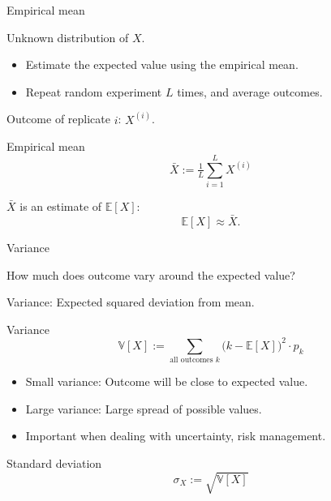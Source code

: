 \documentclass{beamer}
\newcommand{\E}{\mathbb{E}}
\newcommand{\V}{\mathbb{V}}
\newcommand{\1}{\ensuremath{\mathbf{1}}}
\begin{document}
\begin{frame}{Empirical mean}
    \begin{block}{}
        Unknown distribution of $X$.
        \begin{itemize}
            \item Estimate the expected value using the empirical mean.
        \end{itemize}
    \end{block}
    \begin{itemize}
        \item Repeat random experiment $L$ times, and average outcomes.
    \end{itemize}
    Outcome of replicate $i$: $X^{(i)}$.
    \begin{block}{Empirical mean}
        \begin{equation}
            \bar{X} := \tfrac{1}{L} \sum_{i=1}^L X^{(i)}
        \end{equation}
    \end{block}
    $\bar{X}$ is an estimate of $\E[X]$:
    \begin{equation}
        \E[X] \approx \bar{X}.
    \end{equation}
\end{frame}
%
%
%
\begin{frame}{Variance}
    \begin{block}{}
        How much does outcome vary around the expected value?
    \end{block}
    Variance: Expected squared deviation from mean.
    \begin{block}{Variance}
        \begin{equation}
            \V [X] := \sum_{\text{all outcomes }k} \big(k - \E[X]\big)^2 \cdot p_k
        \end{equation}
    \end{block}
    \begin{itemize}
        \item Small variance: Outcome will be close to expected value.
        \item Large variance: Large spread of possible values.
        \item Important when dealing with uncertainty, risk management.
    \end{itemize}
    \begin{block}{Standard deviation}
        \begin{equation}
            \sigma_X := \sqrt{\V[X]}
        \end{equation}
    \end{block}
\end{frame}
\end{document}
